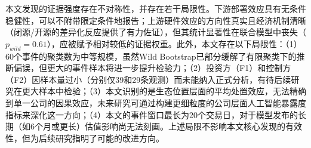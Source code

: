 \documentclass[11pt,fontset=fandol,a4paper]{ctexart}
\begin{document}
本文发现的证据强度存在不对称性，并存在若干局限性。下游部署效应具有无条件稳健性，可以不附带限定条件地报告；上游硬件效应的方向性真实且经济机制清晰（闭源/开源的差异化反应提供了有力佐证），但其统计显著性在联合模型中丧失（$p_{wild}=0.61$），应被赋予相对较低的证据权重。此外，本文存在以下局限性：（1）60个事件的聚类数为中等规模，虽然Wild Bootstrap已部分缓解了有限聚类下的推断偏误，但更大的事件样本将进一步提升检验力；（2）投资方（F1）和控制方（F2）因样本量过小（分别仅39和29条观测）而未能纳入正式分析，有待后续研究在更大样本中检验；（3）本文识别的是生态位置层面的平均处置效应，无法精确到单一公司的因果效应，未来研究可通过构建更细粒度的公司层面人工智能暴露度指标来深化这一方向；（4）本文的事件窗口最长为20个交易日，对于模型发布的长期（如6个月或更长）估值影响尚无法刻画。上述局限不影响本文核心发现的有效性，但为后续研究指明了可能的改进方向。


\end{document}
